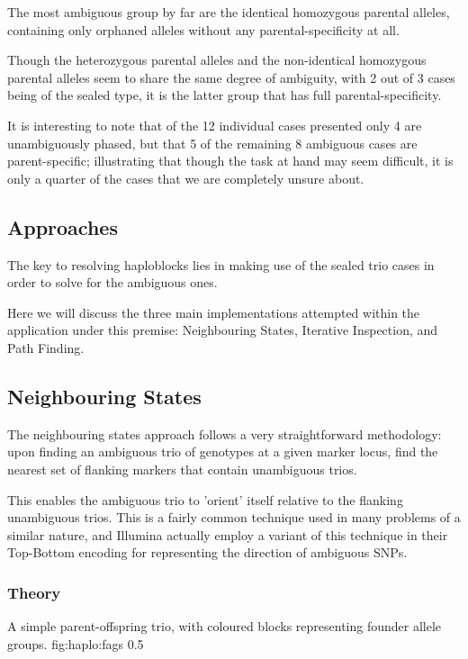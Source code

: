 The most ambiguous group by far are the identical homozygous parental alleles, containing only orphaned alleles without any parental-specificity at all.

Though the heterozygous parental alleles and the non-identical homozygous parental alleles seem to share the same degree of ambiguity, with 2 out of 3 cases being of the sealed type, it is the latter group that has full parental-specificity.

It is interesting to note that of the 12 individual cases presented only 4 are unambiguously phased, but that 5 of the remaining 8 ambiguous cases are parent-specific; illustrating that though the task at hand may seem difficult, it is only a quarter of the cases that we are completely unsure about.


\subsection{Approaches}

The key to resolving haploblocks lies in making use of the sealed trio cases in order to solve for the ambiguous ones. 

Here we will discuss the three main implementations attempted within the application under this premise: Neighbouring States, Iterative Inspection, and Path Finding.

\subsection{Neighbouring States}

The neighbouring states approach follows a very straightforward methodology: upon finding an ambiguous trio of genotypes at a given marker locus, find the nearest set of flanking markers that contain unambiguous trios.

This enables the ambiguous trio to 'orient' itself relative to the flanking unambiguous trios.  This is a fairly common technique used in many problems of a similar nature, and Illumina actually employ a variant of this technique in their Top-Bottom encoding for representing the direction of ambiguous SNPs\citep{illuminatopbot}.

\subsubsection{Theory}

	{A simple parent-offspring trio, with coloured blocks representing founder allele groups.}
	{fig:haplo:fags}
	{0.5}{}



